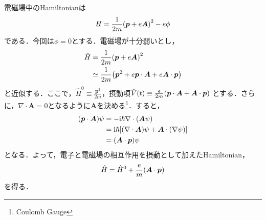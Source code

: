 \documentclass{report}
\begin{document}
  電磁場中のHamiltonianは
  \begin{equation}
    H=\frac{1}{2m}\qty(\bm{p} + e\bm{A})^2 - e\phi
  \end{equation}
  である．今回は$\phi=0$とする．電磁場が十分弱いとし，
  \begin{align}
    \hat{H} &= \frac{1}{2m}\qty(\bm{p}+e\bm{A})^2\\
    &\simeq \frac{1}{2m}\qty(\bm{p}^2+e\bm{p}\cdot\bm{A} + e\bm{A} \cdot \bm{p})\\
  \end{align}
  と近似する．ここで，$\hat{H}^0 \equiv \frac{\bm{p}^2}{2m}$，摂動項$\hat{V}(t) \equiv \frac{e}{2m} \qty(\bm{p}\cdot\bm{A} + \bm{A} \cdot \bm{p})$
  とする．さらに，$\nabla\cdot\bm{A}=0$となるように$\bm{A}$を決める\footnote{Coulomb Gauge}．すると，
  \begin{align}
    \qty(\bm{p} \cdot \bm{A})\psi &= -\mathrm{i}\hbar \nabla \cdot \qty(\bm{A} \psi)\\
    &= \mathrm{i}\hbar\qty[\qty(\nabla \cdot \bm{A}) \psi + \bm{A} \cdot \qty(\nabla \psi)]\\
    &= \qty(\bm{A} \cdot \bm{p}) \psi
  \end{align}
  となる．よって，電子と電磁場の相互作用を摂動として加えたHamiltonian，
  \begin{equation}
    \hat{H} = \hat{H}^0 + \frac{e}{m}\qty(\bm{A} \cdot \bm{p})
  \end{equation}
  を得る．
\end{document}
